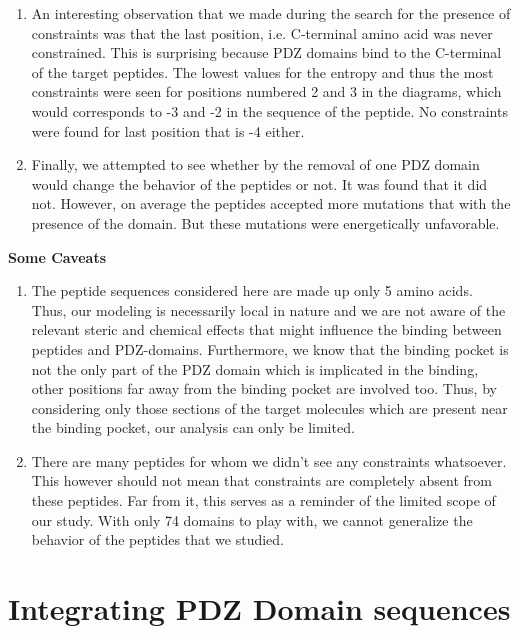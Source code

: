 \documentclass[a4paper, 12pt]{article}
\begin{document}
\begin{enumerate}
\item 

An interesting observation that we made during the search for the presence of constraints was that the last position, i.e. C-terminal amino acid was never constrained. This is surprising because PDZ domains bind to the C-terminal of the target peptides. The lowest values for the entropy and thus the most constraints were seen for positions numbered 2 and 3 in the diagrams, which would corresponds to -3 and -2 in the sequence of the peptide. No constraints were found for last position that is -4 either. 

\item 

Finally, we attempted to see whether by the removal of one PDZ domain would change the behavior of the peptides or not. It was found that it did not. However, on average the peptides accepted more mutations that with the presence of the domain. But these mutations were energetically unfavorable. 
\end{enumerate}

\textbf{Some Caveats}

\begin{enumerate} 
\item 
The peptide sequences considered here are made up only 5 amino acids. Thus, our modeling is necessarily local in nature and we are not aware of the relevant steric and chemical effects that might influence the binding between peptides and PDZ-domains. Furthermore, we know that the binding pocket is not the only part of the PDZ domain which is implicated in the binding, other positions far away from the binding pocket are involved too. Thus, by considering only those sections of the target molecules which are present near the binding pocket, our analysis can only be limited. 

\item 
There are many peptides for whom we didn't see any constraints whatsoever. This however should not mean that constraints are completely absent from these peptides. Far from it, this serves as a reminder of the limited scope of our study. With only 74 domains to play with, we cannot generalize the behavior of the peptides that we studied. 

\end{enumerate}

\pagebreak
\part{Integrating PDZ Domain sequences} 
\end{document}
